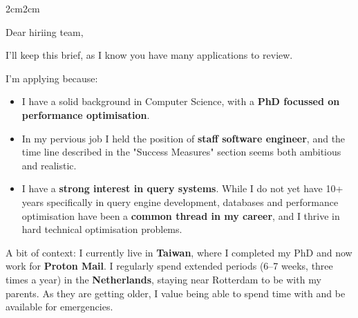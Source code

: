 \documentclass[10pt,a4paper]{../altacv}
\begin{document}

\begin{fullwidth}
\makecvheader



		\vspace{1cm} %



\begin{changemargin}{2cm}{2cm}

\bigskip
\bigskip

Dear hiriing team,

\bigskip


I’ll keep this brief, as I know you have many applications to review.

\bigskip

I’m applying because:
\begin{itemize}
	\item I have a solid background in Computer Science, with a \textbf{PhD focussed on performance optimisation}.
	\item In my pervious job I held the position of \textbf{staff software engineer}, and the time line described in the "Success Measures" section seems both ambitious and realistic.
	\item I have a \textbf{strong interest in query systems}. While I do not yet have 10+ years specifically in query engine development, databases and performance optimisation have been a \textbf{common thread in my career}, and I thrive in hard technical optimisation problems.
\end{itemize}

\bigskip


A bit of context: I currently live in \textbf{Taiwan}, where I completed my PhD and now work for \textbf{Proton Mail}. I regularly spend extended periods (6–7 weeks, three times a year) in the \textbf{Netherlands}, staying near Rotterdam to be with my parents. As they are getting older, I value being able to spend time with and be available for emergencies.


\end{changemargin}
\end{fullwidth}
\end{document}
